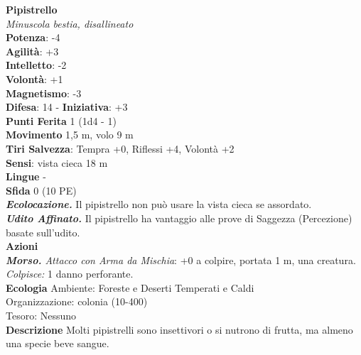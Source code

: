 \begin{multicols}{2}
\medskip\textbf{Pipistrello}\\
\emph{Minuscola bestia, disallineato}\\
\textbf{Potenza}: -4\\
\textbf{Agilità}: +3\\
\textbf{Intelletto}: -2\\
\textbf{Volontà}: +1\\
\textbf{Magnetismo}: -3\\
\textbf{Difesa}: 14 - \textbf{Iniziativa}: +3\\
\textbf{Punti Ferita} 1 (1d4 - 1)\\
\textbf{Movimento} 1,5 m, volo 9 m\\
\textbf{Tiri Salvezza}: Tempra +0, Riﬂessi +4, Volontà +2 \\
\textbf{Sensi}: vista cieca 18 m \\
\textbf{Lingue} -\\
\textbf{Sfida} 0 (10 PE)\smallskip\\
\emph{\textbf{Ecolocazione.}} Il pipistrello non può usare la vista cieca se assordato.\\
\emph{\textbf{Udito Affinato.}} Il pipistrello ha vantaggio alle prove di Saggezza (Percezione) basate sull'udito.\\
\smallskip\textbf{Azioni}\\
\emph{\textbf{Morso.} Attacco con Arma da Mischia}: +0 a colpire, portata 1 m, una creatura.\\
\emph{Colpisce:} 1 danno perforante.\\
\textbf{Ecologia}
Ambiente: Foreste e Deserti Temperati e Caldi\\
Organizzazione: colonia (10-400)\\
Tesoro: Nessuno\\
\textbf{Descrizione}
Molti pipistrelli sono insettivori o si nutrono di frutta, ma almeno una specie beve sangue.\\



\end{multicols}
